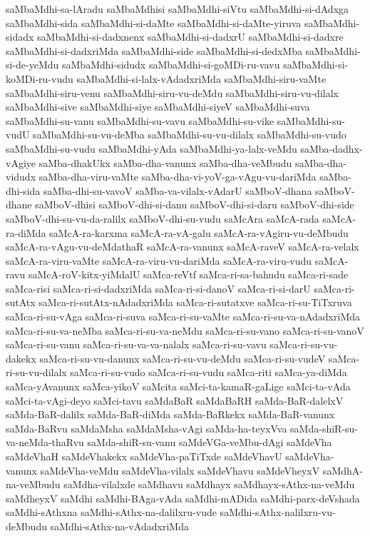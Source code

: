 {saMbaMdhi-sa-lAradu
saMbaMdhisi
saMbaMdhi-siVtu
saMbaMdhi-si-dAdxga
saMbaMdhi-sida
saMbaMdhi-si-daMte
saMbaMdhi-si-daMte-yiruva
saMbaMdhi-sidadx
saMbaMdhi-si-dadxnenx
saMbaMdhi-si-dadxrU
saMbaMdhi-si-dadxre
saMbaMdhi-si-dadxriMda
saMbaMdhi-side
saMbaMdhi-si-dedxMba
saMbaMdhi-si-de-yeMdu
saMbaMdhi-sidudx
saMbaMdhi-si-goMDi-ru-vavu
saMbaMdhi-si-koMDi-ru-vudu
saMbaMdhi-si-lalx-vAdadxriMda
saMbaMdhi-siru-vaMte
saMbaMdhi-siru-venu
saMbaMdhi-siru-vu-deMdu
saMbaMdhi-siru-vu-dilalx
saMbaMdhi-sive
saMbaMdhi-siye
saMbaMdhi-siyeV
saMbaMdhi-suva
saMbaMdhi-su-vanu
saMbaMdhi-su-vavu
saMbaMdhi-su-vike
saMbaMdhi-su-vudU
saMbaMdhi-su-vu-deMba
saMbaMdhi-su-vu-dilalx
saMbaMdhi-su-vudo
saMbaMdhi-su-vudu
saMbaMdhi-yAda
saMbaMdhi-ya-lalx-veMdu
saMba-dadhx-vAgiye
saMba-dhakUkx
saMba-dha-vanunx
saMba-dha-veMbudu
saMba-dha-vidudx
saMba-dha-viru-vaMte
saMba-dha-vi-yoV-ga-vAgu-vu-dariMda
saMba-dhi-sida
saMba-dhi-su-vavoV
saMba-va-vilalx-vAdarU
saMboV-dhana
saMboV-dhane
saMboV-dhisi
saMboV-dhi-si-danu
saMboV-dhi-si-daru
saMboV-dhi-side
saMboV-dhi-su-vu-da-ralilx
saMboV-dhi-su-vudu
saMcAra
saMcA-rada
saMcA-ra-diMda
saMcA-ra-karxma
saMcA-ra-vA-galu
saMcA-ra-vAgiru-vu-deMbudu
saMcA-ra-vAgu-vu-deMdathaR
saMcA-ra-vanunx
saMcA-raveV
saMcA-ra-velalx
saMcA-ra-viru-vaMte
saMcA-ra-viru-vu-dariMda
saMcA-ra-viru-vudu
saMcA-ravu
saMcA-roV-kitx-yiMdalU
saMca-reVtf
saMca-ri-sa-bahudu
saMca-ri-sade
saMca-risi
saMca-ri-si-dadxriMda
saMca-ri-si-danoV
saMca-ri-si-darU
saMca-ri-sutAtx
saMca-ri-sutAtx-nAdadxriMda
saMca-ri-sutatxve
saMca-ri-su-TiTxruva
saMca-ri-su-vAga
saMca-ri-suva
saMca-ri-su-vaMte
saMca-ri-su-va-nAdadxriMda
saMca-ri-su-va-neMba
saMca-ri-su-va-neMdu
saMca-ri-su-vano
saMca-ri-su-vanoV
saMca-ri-su-vanu
saMca-ri-su-va-va-nalalx
saMca-ri-su-vavu
saMca-ri-su-vu-dakekx
saMca-ri-su-vu-danunx
saMca-ri-su-vu-deMdu
saMca-ri-su-vudeV
saMca-ri-su-vu-dilalx
saMca-ri-su-vudo
saMca-ri-su-vudu
saMca-riti
saMca-ya-diMda
saMca-yAvanunx
saMca-yikoV
saMcita
saMci-ta-kamaR-gaLige
saMci-ta-vAda
saMci-ta-vAgi-deyo
saMci-tavu
saMdaBaR
saMdaBaRH
saMda-BaR-dalelxV
saMda-BaR-dalilx
saMda-BaR-diMda
saMda-BaRkekx
saMda-BaR-vanunx
saMda-BaRvu
saMdaMsha
saMdaMsha-vAgi
saMda-ha-teyxVva
saMda-shiR-su-va-neMda-thaRvu
saMda-shiR-su-vanu
saMdeVGa-veMbu-dAgi
saMdeVha
saMdeVhaH
saMdeVhakekx
saMdeVha-paTiTxde
saMdeVhavU
saMdeVha-vanunx
saMdeVha-veMdu
saMdeVha-vilalx
saMdeVhavu
saMdeVheyxV
saMdhA-na-veMbudu
saMdha-vilalxde
saMdhavu
saMdhayx
saMdhayx-sAthx-na-veMdu
saMdheyxV
saMdhi
saMdhi-BAga-vAda
saMdhi-mADida
saMdhi-parx-deVshada
saMdhi-sAthxna
saMdhi-sAthx-na-dalilxru-vude
saMdhi-sAthx-nalilxru-vu-deMbudu
saMdhi-sAthx-na-vAdadxriMda
}
